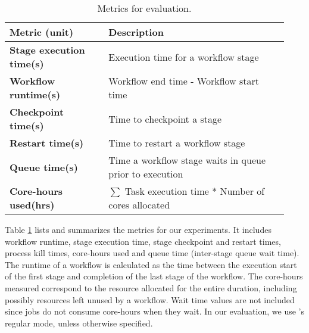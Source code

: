 \begin{table}[t]
\centering
\begin{tabular}{p{0.33\linewidth}|p{0.6\linewidth}}
\textbf{Metric (unit)} & \textbf{Description} \\
\hline \hline
\textbf{Stage execution time(s)} & Execution time for a workflow stage \\ \hline
\textbf{Workflow runtime(s)} & Workflow end time - Workflow start time \\ \hline
\textbf{Checkpoint time(s)} & Time to checkpoint a stage \\ \hline
\textbf{Restart time(s)} & Time to restart a workflow stage \\ \hline
\textbf{Queue time(s)} &  Time a workflow stage waits in queue prior to execution \\\hline
\textbf{Core-hours used(hrs)} & $\sum$ Task execution time * Number of cores allocated \\
\hline
\end{tabular}
\caption{\small Metrics for evaluation.}
\label{tab:metrics}
\vspace{-0.5cm}
\end{table}

Table \ref{tab:metrics} lists and summarizes the metrics for our experiments.
It includes workflow runtime, stage execution time, stage checkpoint and restart
times, process kill times, core-hours used and queue time (inter-stage queue wait time).
The runtime of a workflow is calculated as the time between the execution
start of the first stage and completion of the last stage of the workflow.
The core-hours measured correspond to the resource allocated for the entire duration, including possibly resources
left unused by a workflow. Wait time values are not included since jobs
do not consume core-hours when they wait. 
In our evaluation, we use \systemname's regular mode, unless otherwise specified. 



